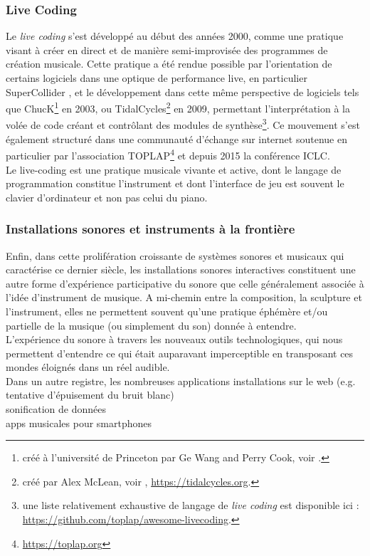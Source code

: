 \subsubsection{Live Coding}

\noindent Le \textit{live coding} s'est développé au début des années 2000, comme une pratique visant à créer en direct et de manière semi-improvisée des programmes de création musicale. Cette pratique a été rendue possible par l'orientation de certains logiciels dans une optique de performance live, en particulier SuperCollider \cite{mccartney_rethinking_2002}, et le développement dans cette même perspective de logiciels tels que ChucK\footnote{créé à l'université de Princeton par Ge Wang and Perry Cook, voir \cite{wang_chuck_2003}.} en 2003, ou TidalCycles\footnote{créé par Alex McLean, voir \cite{mclean_tidalpattern_2010}, \url{https://tidalcycles.org}.} en 2009, permettant l'interprétation à la volée de code créant et contrôlant des modules de synthèse\footnote{une liste relativement exhaustive de langage de \textit{live coding} est disponible ici : \url{https://github.com/toplap/awesome-livecoding}.}. Ce mouvement s'est également structuré dans une communauté d'échange sur internet soutenue en particulier par l'association TOPLAP\footnote{\url{https://toplap.org}} et depuis 2015 la conférence \gls{ICLC}.\\
\indent Le live-coding est une pratique musicale vivante et active, dont le langage de programmation constitue l'instrument \cite{blackwell_programming_2005} et dont l'interface de jeu est souvent le clavier d'ordinateur et non pas celui du piano.\\


\subsubsection{Installations sonores et instruments à la frontière}

\noindent Enfin, dans cette prolifération croissante de systèmes sonores et musicaux qui caractérise ce dernier siècle, les installations sonores interactives constituent une autre forme d'expérience participative du sonore que celle généralement associée à l'idée d'instrument de musique. A mi-chemin entre la composition, la sculpture et l'instrument, elles ne permettent souvent qu'une pratique éphémère et/ou partielle de la musique (ou simplement du son) donnée à entendre.\\
\indent L'expérience du sonore à travers les nouveaux outils technologiques, qui nous permettent d'entendre ce qui était auparavant imperceptible en transposant ces mondes éloignés dans un réel audible.\\
\indent Dans un autre registre, les nombreuses applications
installations sur le web (e.g. tentative d'épuisement du bruit blanc)\\
sonification de données\\
apps musicales pour smartphones

